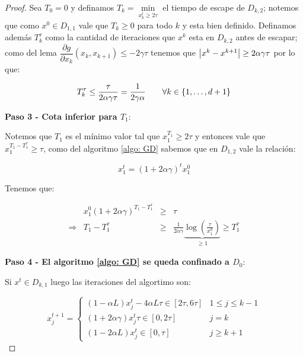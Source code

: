 \begin{proof}
	Sea $T_0 = 0$ y definamos $T_k = \min\limits_{x^t_k \geq 2\tau}$ el tiempo de escape de $D_{k,2}$; notemos que como $x^0 \in D_{1,1}$ vale que $T_k \geq 0$ para todo $k$ y esta bien definido. Definamos adem\'as $T_k^{\tau}$ como la cantidad de iteraciones que $x^k$ esta en $D_{k,2}$ antes de escapar; como del lema $\dfrac{\partial g}{\partial x_k}\left(x_k, x_{k+1}\right) \leq -2\gamma \tau$ tenemos que $\left\lvert x^k - x^{k+1}\right\rvert \geq 2 \alpha \gamma \tau $ por lo que:
	
	\begin{equation*}
		T_k^{\tau} \leq \frac{\tau}{2 \alpha \gamma \tau} = \frac{1}{2 \gamma \alpha} \qquad \forall k \in \left\lbrace1, \dots, d+1\right\rbrace
	\end{equation*}
	
	\medskip
	
	\textbf{Paso 3 - Cota inferior para $T_1$}:
	
	\medskip
	
	Notemos que $T_1$ es el m\'inimo valor tal que $x^{T_1}_1 \geq 2\tau$ y entonces vale que $x_1^{T_1 - T_1^{\tau}} \geq \tau$, como del algoritmo \ref{algo: GD} sabemos que en $D_{1,2}$ vale la relaci\'on:
	
	\begin{equation*}
	x_1^{t} = \left(1 + 2 \alpha \gamma\right)^t x_1^0
	\end{equation*}
	
	Tenemos que:
	
	\begin{equation*}
	\begin{array}{crcl}
	& x_1^0 \left(1 + 2 \alpha \gamma \right)^{T_1 - T_1^{\tau}} & \geq & \tau \\
	\Longrightarrow & T_1 - T_1^{\tau} & \geq & \frac{1}{2 \alpha \gamma} \underbrace{\log\left(\frac{\tau}{x_1^0}\right)}_{\geq 1}  \geq T_1^{\tau}
	\end{array}
	\end{equation*}
	
	\medskip
	
	\textbf{Paso 4 - El algoritmo \ref{algo: GD} se queda confinado a $D_0$}:
	
	\medskip
	
	Si $x^t \in D_{k,1}$ luego las iteraciones del algortimo son:
	
	\begin{equation*}
		x_j^{t+1} = \left\lbrace \begin{array}{cr}
		\left(1 - \alpha L\right)x_j^t - 4\alpha L \tau \in [2\tau, 6\tau] & 1 \leq j \leq k-1 \\
		\left(1 + 2\alpha \gamma \right)x_j^t \tau \in [0, 2\tau] & j = k \\
		\left(1 - 2\alpha L\right)x_j^t \in [0, \tau] & j \geq k+1 
		\end{array}\right.
	\end{equation*}
	

\end{proof}
